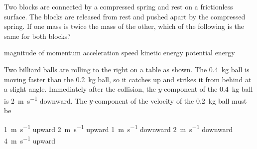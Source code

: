 \documentclass{../../../oss-apphys-exam}
\begin{document}
\begin{multicols*}{2}
\begin{questions}
    \question Two blocks are connected by a compressed spring and rest on a
    frictionless surface. The blocks are released from rest and pushed apart
    by the compressed spring. If one mass is twice the mass of the other,
    which of the following is the same for both blocks?
    \begin{choices}
      \choice magnitude of momentum
      \choice acceleration
      \choice speed
      \choice kinetic energy
      \choice potential energy
    \end{choices}
    \columnbreak
    
    
    \question Two billiard balls are rolling to the right on a table as shown.
    The \SI{.4}{\kilo\gram} ball is moving faster than the \SI{.2}{\kilo\gram}
    ball, so it catches up and strikes it from behind at a slight angle.
    Immediately after the collision, the $y$-component of the
    \SI{.4}{\kilo\gram} ball is \SI{2}{\metre\per\second} downward.
    The $y$-component of the velocity of the \SI{.2}{\kilo\gram} ball must be
    \begin{center}
    \end{center}
    \begin{choices}
      \choice\SI{1}{\metre\per\second} upward
      \choice\SI{2}{\metre\per\second} upward
      \choice\SI{1}{\metre\per\second} downward
      \choice\SI{2}{\metre\per\second} downward
      \choice\SI{4}{\metre\per\second} upward
    \end{choices}


\end{questions}
\end{multicols*}
\end{document}

